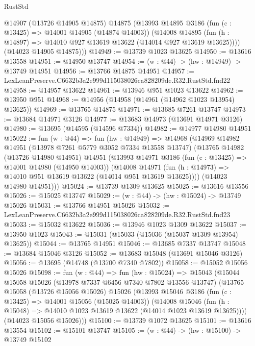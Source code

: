 \begin{lexlean}{RustStd}
\begin{coremodule}
        @14907
        (@13726 @14905 @14875)
        @14875
        (@13993
          @14895
          @3186
          (fun (c : @13425) => @14001 @14905 (@14874 @14003))
          (@14008
            @14895
            (fun (h : @14897) => @14010 @927 @13619 @13622 (@14014 @927 @13619 @13625))))
        (@14023 @14905 @14875)))
@14949 := @13739 @1023 @13625
@14950 := @13616 @13558
@14951 := @14950 @13747
@14954 := (w : @44) -> (hw : @14949) -> @13749 @14951
@14956 := @13766 @14875 @14951
@14957 := LexLeanPreserve.C6632b3a2e999d115038026ca828209de.R32.RustStd.fnd22
@14958 := @14957 @13622
@14961 := @13946 @951 @1023 @13622
@14962 := @13950 @951
@14968 := @14956 (@14958 (@14961 (@14962 @1023 @13954) @13625))
@14969 := @13765 @14875
@14971 := @13685 @7261 @13747
@14973 := @13684 @14971 @3126
@14977 := @13683 @14973 (@13691 @14971 @3126)
@14980 := @13695 (@14595 (@14596 @7334))
@14982 := @14977 @14980 @14951
@15022 := fun (w : @44) =>
  fun (hw : @14949) =>
  @14968
    (@14969
      @14982
      @14951
      (@13978 @7261 @5779 @3052 @7334 @13558 @13747)
      (@13765
        @14982
        (@13726 @14980 @14951)
        @14951
        (@13993
          @14971
          @3186
          (fun (c : @13425) => @14001 @14980 (@14950 @14003))
          (@14008
            @14971
            (fun (h : @14973) => @14010 @951 @13619 @13622 (@14014 @951 @13619 @13625))))
        (@14023 @14980 @14951)))
@15024 := @13739 @1309 @13625
@15025 := @13616 @13556
@15026 := @15025 @13747
@15029 := (w : @44) -> (hw : @15024) -> @13749 @15026
@15031 := @13766 @14951 @15026
@15032 := LexLeanPreserve.C6632b3a2e999d115038026ca828209de.R32.RustStd.fnd23
@15033 := @15032 @13622
@15036 := @13946 @1023 @1309 @13622
@15037 := @13950 @1023
@15043 := @15031 (@15033 (@15036 (@15037 @1309 @13954) @13625))
@15044 := @13765 @14951
@15046 := @13685 @7337 @13747
@15048 := @13684 @15046 @3126
@15052 := @13683 @15048 (@13691 @15046 @3126)
@15056 := @13695 (@14748 (@13700 @7340 @7802))
@15058 := @15052 @15056 @15026
@15098 := fun (w : @44) =>
  fun (hw : @15024) =>
  @15043
    (@15044
      @15058
      @15026
      (@13978 @7337 @6456 @7340 @7802 @13556 @13747)
      (@13765
        @15058
        (@13726 @15056 @15026)
        @15026
        (@13993
          @15046
          @3186
          (fun (c : @13425) => @14001 @15056 (@15025 @14003))
          (@14008
            @15046
            (fun (h : @15048) => @14010 @1023 @13619 @13622 (@14014 @1023 @13619 @13625))))
        (@14023 @15056 @15026)))
@15100 := @13739 @1072 @13625
@15101 := @13616 @13554
@15102 := @15101 @13747
@15105 := (w : @44) -> (hw : @15100) -> @13749 @15102

\end{coremodule}
\end{lexlean}
